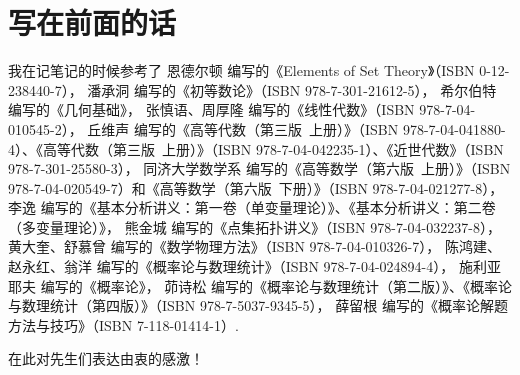 \chapter*{写在前面的话}
我在记笔记的时候参考了%
恩德尔顿 编写的《Elements of Set Theory》（ISBN 0-12-238440-7），%
潘承洞 编写的《初等数论》（ISBN 978-7-301-21612-5），%
希尔伯特 编写的《几何基础》，%
张慎语、周厚隆 编写的《线性代数》（ISBN 978-7-04-010545-2），%
丘维声 编写的《高等代数（第三版\ 上册）》（ISBN 978-7-04-041880-4）、《高等代数（第三版\ 上册）》（ISBN 978-7-04-042235-1）、《近世代数》（ISBN 978-7-301-25580-3），%
同济大学数学系 编写的《高等数学（第六版\ 上册）》（ISBN 978-7-04-020549-7）和《高等数学（第六版\ 下册）》（ISBN 978-7-04-021277-8），%
李逸 编写的《基本分析讲义：第一卷（单变量理论）》、《基本分析讲义：第二卷（多变量理论）》，%
熊金城 编写的《点集拓扑讲义》（ISBN 978-7-04-032237-8），%
黄大奎、舒慕曾 编写的《数学物理方法》（ISBN 978-7-04-010326-7），%
陈鸿建、赵永红、翁洋 编写的《概率论与数理统计》（ISBN 978-7-04-024894-4），%
施利亚耶夫 编写的《概率论》，%
茆诗松 编写的《概率论与数理统计（第二版）》、《概率论与数理统计（第四版）》（ISBN 978-7-5037-9345-5），%
薛留根 编写的《概率论解题方法与技巧》（ISBN 7-118-01414-1）.

在此对先生们表达由衷的感激！
